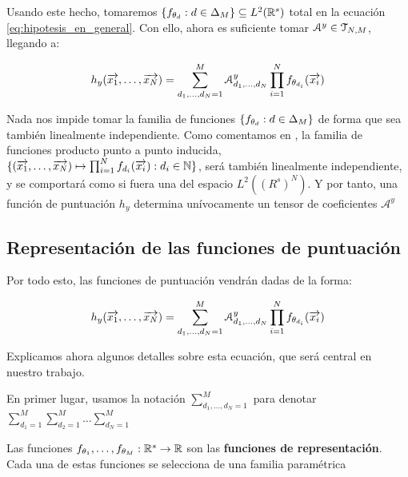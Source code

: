 Usando este hecho, tomaremos $\{f_{\theta_d}: d \in \Delta_{M}\} \subseteq L^2(\mathbb{R}^s)$ total en la ecuación \eqref{eq:hipotesis_en_general}. Con ello, ahora es suficiente tomar $\mathcal{A}^y \in \mathcal{T}_{N, M}$, llegando a:

\begin{equation}
    h_y(\overrightarrow{x_1}, \ldots, \overrightarrow{x_N}) = \sum_{d_1, \ldots, d_N = 1}^{M} \mathcal{A}^y_{d_1, \ldots, d_N} \prod_{i = 1}^N f_{\theta_{d_i}}(\overrightarrow{x_i})
\end{equation}

\begin{observacion}

    Nada nos impide tomar la familia de funciones $\{f_{\theta_d}: d \in \Delta_{M}\}$ de forma que sea también linealmente independiente. Como comentamos en , la familia de funciones producto punto a punto inducida, $
        \{ (\overrightarrow{x_1}, \ldots, \overrightarrow{x_N}) \mapsto \prod_{i = 1}^N f_{d_i}(\overrightarrow{x_i}): d_i \in \mathbb{N} \}$, será también linealmente independiente, y se comportará como si fuera una  del espacio $L^2((R^s)^N)$. Y por tanto, una función de puntuación $h_y$ determina unívocamente un tensor de coeficientes $\mathcal{A}^y$

\end{observacion}

\subsection{Representación de las funciones de puntuación} \label{sec:repr_funciones_puntuacion}

Por todo esto, las funciones de puntuación vendrán dadas de la forma:

\begin{equation} \label{eq:puntuacion_general}
    h_y(\overrightarrow{x_1}, \ldots, \overrightarrow{x_N}) = \sum_{d_1, \ldots, d_N = 1}^{M} \mathcal{A}^y_{d_1, \ldots, d_N} \prod_{i = 1}^N f_{\theta_{d_i}}(\overrightarrow{x_i})
\end{equation}

Explicamos ahora algunos detalles sobre esta ecuación, que será central en nuestro trabajo.

En primer lugar, usamos la notación $\sum_{d_1, \ldots, d_N = 1}^{M}$ para denotar $\sum_{d_1 = 1}^{M} \sum_{d_2 = 1}^{M} \ldots \sum_{d_N = 1}^{M}$

Las funciones $f_{\theta_1}, \ldots, f_{\theta_M}: \mathbb{R}^s \to \mathbb{R}$ son las \textbf{funciones de representación}. Cada una de estas funciones se selecciona de una familia paramétrica

